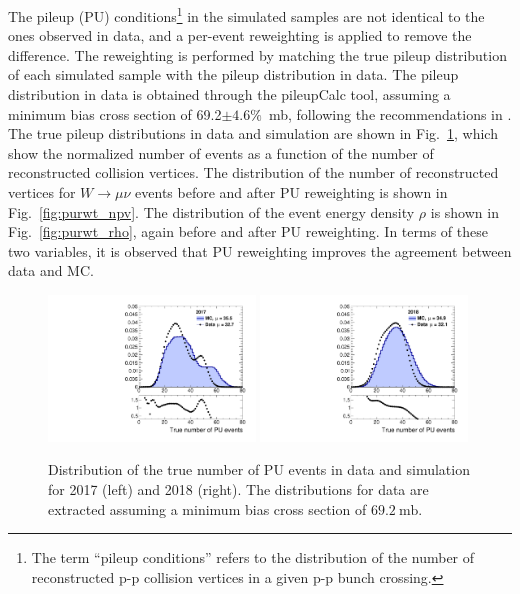 The pileup (PU) conditions\footnote{The term ``pileup conditions'' refers to the distribution 
of the number of reconstructed p-p collision vertices in a given p-p bunch crossing.} 
in the simulated samples are not identical to the ones observed in data, and a per-event reweighting is applied to remove the difference.
The reweighting is performed by matching the true pileup distribution of each simulated sample
with the pileup distribution in data. The pileup distribution in data is obtained through 
the pileupCalc tool, assuming a minimum bias cross section of 69.2$\pm 4.6\%$~mb, following the recommendations in \cite{pileup_twiki}.
The true pileup distributions in data and simulation are shown in Fig.~\ref{fig:purwg_true}, which show the normalized number of events as a function of 
the number of reconstructed collision vertices. 
The distribution of the number of reconstructed vertices 
for $W\to \mu\nu$ events before and after PU reweighting is shown in Fig.~\ref{fig:purwt_npv}. The distribution of the event energy density 
$\rho$ is shown in Fig.~\ref{fig:purwt_rho}, again before and after PU reweighting. 
In terms of these two variables, it is observed that PU reweighting improves the agreement between data and MC.

\begin{figure}[ht!]
  \begin{center}
    \includegraphics[width=0.49\textwidth]{Pileup/pu_weights_2017.pdf}
    \includegraphics[width=0.49\textwidth]{Pileup/pu_weights_2018.pdf}
    \caption{
        Distribution of the true number of PU events in data and simulation for 2017 (left) and 2018 (right).
        The distributions for data are extracted assuming a minimum bias cross section of $69.2~\mathrm{mb}$.
    }
    \label{fig:purwg_true}
  \end{center}
\end{figure}

